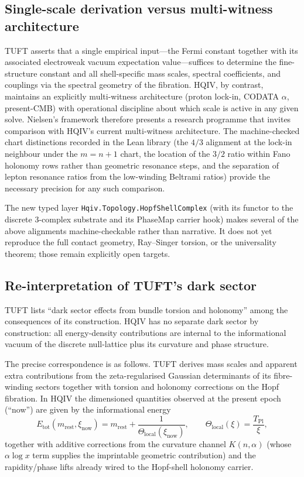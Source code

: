\documentclass[11pt]{article}
\begin{document}
\subsection{Single-scale derivation versus multi-witness architecture}

TUFT asserts that a single empirical input—the Fermi constant together
with its associated electroweak vacuum expectation value—suffices to
determine the fine-structure constant and all shell-specific mass
scales, spectral coefficients, and couplings via the spectral geometry
of the fibration. HQIV, by contrast, maintains an explicitly
multi-witness architecture (proton lock-in, CODATA $\alpha$, present-CMB)
with operational discipline about which scale is active in any given
solve. Nielsen's framework therefore presents a research programme that
invites comparison with HQIV's current multi-witness architecture. The
machine-checked chart distinctions recorded in the Lean library (the
$4/3$ alignment at the lock-in neighbour under the $m = n + 1$ chart, the
location of the $3/2$ ratio within Fano holonomy rows rather than
geometric resonance steps, and the separation of lepton resonance ratios
from the low-winding Beltrami ratios) provide the necessary precision for
any such comparison.

The new typed layer \texttt{Hqiv.Topology.HopfShellComplex} (with its
functor to the discrete 3-complex substrate and its PhaseMap carrier
hook) makes several of the above alignments machine-checkable rather
than narrative. It does not yet reproduce the full contact geometry,
Ray--Singer torsion, or the universality theorem; those remain
explicitly open targets.

\subsection{Re-interpretation of TUFT's dark sector}

TUFT lists ``dark sector effects from bundle torsion and holonomy'' among
the consequences of its construction. HQIV has no separate dark sector
by construction: all energy-density contributions are internal to the
informational vacuum of the discrete null-lattice plus its curvature and
phase structure.

The precise correspondence is as follows. TUFT derives mass scales and
apparent extra contributions from the zeta-regularised Gaussian
determinants of its fibre-winding sectors together with torsion and
holonomy corrections on the Hopf fibration. In HQIV the dimensioned
quantities observed at the present epoch (``now'') are given by the
informational energy
\[
E_{\mathrm{tot}}(m_{\mathrm{rest}},\xi_{\mathrm{now}})
= m_{\mathrm{rest}} + \frac{1}{\Theta_{\mathrm{local}}(\xi_{\mathrm{now}})},
\qquad
\Theta_{\mathrm{local}}(\xi) = \frac{T_{\mathrm{Pl}}}{\xi},
\]
together with additive corrections from the curvature channel
$K(n,\alpha)$ (whose $\alpha\log x$ term supplies the imprintable
geometric contribution) and the rapidity/phase lifts already wired to
the Hopf-shell holonomy carrier.
\end{document}
